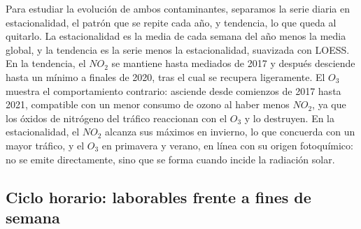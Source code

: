 \documentclass[notspecified,article,submit,oneauthor,pdftex]{Definitions/mdpi}
\begin{document}
Para estudiar la evolución de ambos contaminantes, separamos la serie
diaria en estacionalidad, el patrón que se repite cada año, y tendencia,
lo que queda al quitarlo. La estacionalidad es la media de cada semana
del año menos la media global, y la tendencia es la serie menos la
estacionalidad, suavizada con LOESS. En la tendencia, el \(NO_2\) se
mantiene hasta mediados de 2017 y después desciende hasta un mínimo a
finales de 2020, tras el cual se recupera ligeramente. El \(O_3\)
muestra el comportamiento contrario: asciende desde comienzos de 2017
hasta 2021, compatible con un menor consumo de ozono al haber menos
\(NO_2\), ya que los óxidos de nitrógeno del tráfico reaccionan con el
\(O_3\) y lo destruyen. En la estacionalidad, el \(NO_2\) alcanza sus
máximos en invierno, lo que concuerda con un mayor tráfico, y el \(O_3\)
en primavera y verano, en línea con su origen fotoquímico: no se emite
directamente, sino que se forma cuando incide la radiación solar.

\subsection{Ciclo horario: laborables frente a fines de
semana}\label{ciclo-horario-laborables-frente-a-fines-de-semana}
\end{document}
